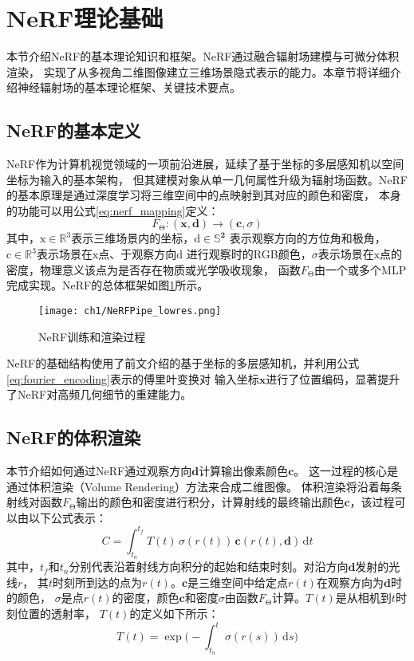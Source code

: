 \newpage
\section{NeRF理论基础}
本节介绍NeRF的基本理论知识和框架。NeRF通过融合辐射场建模与可微分体积渲染，
实现了从多视角二维图像建立三维场景隐式表示的能力。本章节将详细介绍神经辐射场的基本理论框架、关键技术要点。

\subsection{NeRF的基本定义}
NeRF作为计算机视觉领域的一项前沿进展，延续了基于坐标的多层感知机以空间坐标为输入的基本架构，
但其建模对象从单一几何属性升级为辐射场函数。NeRF的基本原理是通过深度学习将三维空间中的点映射到其对应的颜色和密度，
本身的功能可以用公式\eqref{eq:nerf_mapping}定义：
\begin{equation}
  F_{\upTheta}:({\boldsymbol{x}}, {\boldsymbol{d}})\rightarrow({\boldsymbol{c}},\sigma)
  \label{eq:nerf_mapping}
\end{equation}
其中，$\mathrm{x}\in\mathbb{R}^3$表示三维场景内的坐标，$\mathrm{d}\in\mathbb{S}^\boldsymbol{2}$
表示观察方向的方位角和极角，$\mathrm{c}\in\mathbb{R}^3$表示场景在$\mathrm{x}$点、于观察方向$\mathrm{d}$
进行观察时的RGB颜色，$\sigma$表示场景在$\mathrm{x}$点的密度，物理意义该点为是否存在物质或光学吸收现象，
函数$F_{\upTheta}$由一个或多个MLP完成实现。NeRF的总体框架如图\ref{fig:nerf_pipe}所示。
\begin{figure}[htbp]
  \centering
  \texttt{[image: ch1/NeRFPipe\_lowres.png]}
  \caption{NeRF训练和渲染过程\cite{Mildenhall_2020}}
  \label{fig:nerf_pipe}
\end{figure}

NeRF的基础结构使用了前文介绍的基于坐标的多层感知机，并利用公式\eqref{eq:fourier_encoding}表示的傅里叶变换对
输入坐标$\boldsymbol x$进行了位置编码，显著提升了NeRF对高频几何细节的重建能力。

\subsection{NeRF的体积渲染}

本节介绍如何通过NeRF通过观察方向$\boldsymbol d$计算输出像素颜色$\boldsymbol c$。
这一过程的核心是通过体积渲染（Volume Rendering）方法来合成二维图像。
体积渲染将沿着每条射线对函数$F_{\upTheta}$输出的颜色和密度进行积分，计算射线的最终输出颜色$\boldsymbol c$，该过程可以由以下公式表示：
\begin{equation}\label{eq:volume_rendering}
C=\int_{t_n}^{t_f}T(t)\,\sigma(r(t))\,{\boldsymbol c}(r(t),{\boldsymbol d})\,\mathrm{d}t
\end{equation}
其中，$t_f$和$t_n$分别代表沿着射线方向积分的起始和结束时刻。对沿方向$\boldsymbol{d}$发射的光线$r$，
其$t$时刻所到达的点为$r(t)$。$\boldsymbol{c}$是三维空间中给定点$r(t)$在观察方向为$\boldsymbol{d}$时的颜色，
$\sigma$是点$r(t)$的密度，颜色$\boldsymbol c$和密度$\sigma$由函数$F_{\upTheta}$计算。$T(t)$是从相机到$t$时刻位置的透射率，
$T(t)$的定义如下所示：
\begin{equation}\label{eq:transmittance}
T(t)=\exp\Biggl(-\int_{t_n}^{t}\sigma(r(s))\,\mathrm{d}s\Biggr)
\end{equation}

